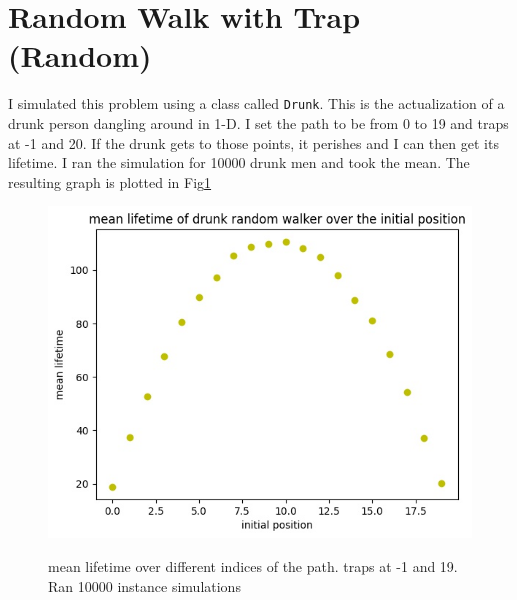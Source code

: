 \documentclass[12pt]{article}
\begin{document}
	\section{Random Walk with Trap (Random)}
	I simulated this problem using a class called \texttt{Drunk}. This is the actualization of a 
	drunk person dangling around in 1-D. I set the path to be from 0 to 19 and traps at -1 and 20.
	If the drunk gets to those points, it perishes and I can then get its lifetime.
	I ran the simulation for 10000 drunk men and took the mean.
	The resulting graph is plotted in Fig\ref{fig:rw_trap}
	\begin{figure}[h!]
		\centering
		\includegraphics[width=0.9\linewidth]{../p3/drunk.jpg}
		\label{fig:rw_trap}
		\caption{mean lifetime over different indices of the path. traps at -1 and 19. Ran 10000
		instance simulations}
	\end{figure}
\end{document}
